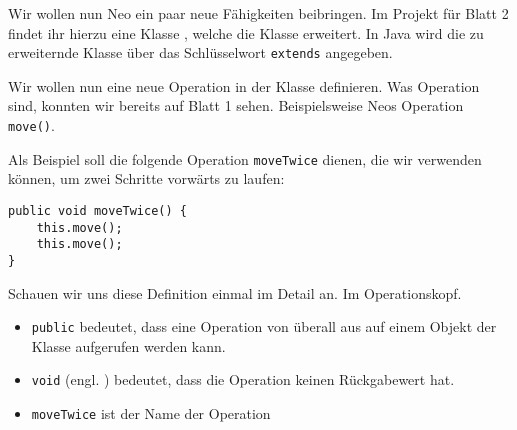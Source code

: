 
    Wir wollen nun Neo ein paar neue Fähigkeiten beibringen.
    Im Projekt für Blatt 2 findet ihr hierzu eine Klasse \ownclass{},
    welche die Klasse \superclass{}  erweitert. In Java wird die zu erweiternde Klasse über das Schlüsselwort \lstinline{extends} angegeben.

    Wir wollen nun eine neue Operation in der Klasse \ownclass{} definieren. Was Operation sind, konnten wir bereits auf Blatt 1 sehen. Beispielsweise Neos Operation \lstinline{move()}.

    Als Beispiel soll die folgende Operation \texttt{moveTwice} dienen, die wir verwenden können, um zwei Schritte vorwärts zu laufen:
    \begin{lstlisting}
public void moveTwice() {
    this.move();
    this.move();
}
    \end{lstlisting}
    Schauen wir uns diese Definition einmal im Detail an. Im Operationskopf.
    \begin{itemize}
    \item \lstinline{public} bedeutet, dass eine Operation von überall aus auf einem Objekt der Klasse aufgerufen werden kann.
    \item \lstinline{void} (engl. ) bedeutet, dass die Operation keinen Rückgabewert hat.
    \item \lstinline{moveTwice} ist der Name der Operation
    \end{itemize}

